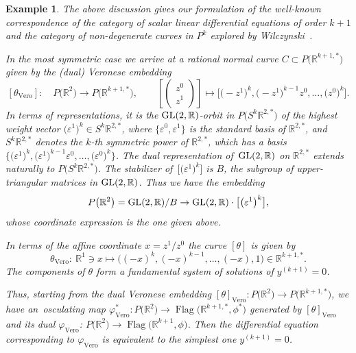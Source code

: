 \documentclass[10pt,a4paper]{amsart}
\newcommand{\R}{\mathbb R}
\newcommand{\Flag}{\operatorname{Flag}}
\newtheorem{ex}[thm]{Example}
\numberwithin{equation}{section}
\begin{document}
\begin{ex}
The above discussion gives our formulation of the well-known correspondence of the category of scalar linear differential equations of order $k+1$ and the category of non-degenerate curves in $P^k$ explored by Wilczynski~\cite{wilch}.

In the most symmetric case we arrive at a rational normal curve $C\subset P\big(\R^{k+1,*}\big)$ given by the (dual) Veronese embedding
\[
[\theta_\text{{Vero}}] \colon\quad P\big(\R^2\big)\to P\big(\R^{k+1,*}\big),\qquad
\left[\begin{pmatrix}z^0\\ z^1\end{pmatrix}\right]\mapsto \big[\big({-}z^1\big)^k, \big({-}z^1\big)^{k-1}z^0, \dots, \big(z^0\big)^k\big].
\]
In terms of representations, it is the ${\rm GL}(2,\R)$-orbit in $P\big(S^k\R^{2,*}\big)$ of the highest weight vector $\big(\varepsilon^1\big)^k\in S^k\R^{2,*}$, where $\big\{\varepsilon^0,\varepsilon^1\big\}$ is the standard basis of $\R^{2,*}$, and $S^k\R^{2,*}$ denotes the $k$-th symmetric power of $\R^{2,*}$, which has a basis $\big\{ \big(\varepsilon^1\big)^k, \big(\varepsilon^1\big)^{k-1}\varepsilon^0, \dots, \big(\varepsilon^0\big)^k \big\}$. The dual representation of~${\rm GL}(2,\R)$ on $\R^{2,*}$ extends naturally to $P\big(S^k\R^{2,*}\big)$. The stabilizer of~$\big[\big(\varepsilon^1\big)^k\big]$ is $B$, the subgroup of upper-triangular matrices in ${\rm GL}(2,\R)$. Thus we have the embedding
\[
P\big(\R^2\big)={\rm GL}(2,\R)/B \to {\rm GL}(2,\R)\cdot \big[\big(\varepsilon^1\big)^k\big],
\]
whose coordinate expression is the one given above.

In terms of the affine coordinate $x=z^1/z^0$ the curve $[\theta]$ is given by
\[
\theta_{\text{Vero}} \colon\ \R^1\ni x\mapsto \big( (-x)^k, (-x)^{k-1},\dots, (-x), 1\big) \in \R^{k+1,*}.
\]
The components of $\theta$ form a fundamental system of solutions of $y^{(k+1)}=0$.

Thus, starting from the dual Veronese embedding $[\theta]_{\text{Vero}}\colon P\big(\R^2\big) \to P\big(\R^{k+1,*}\big)$, we have an~oscu\-lating map $\varphi^*_{\text{Vero}}\colon P\big(\R^2\big)\to \Flag\big(\R^{k+1,*},\phi^*\big)$ generated by $[\theta]_{\text{Vero}}$ and its dual $\varphi_{\text{Vero}}$: $P\big(\R^2\big)\to \Flag\big(\R^{k+1},\phi\big)$. Then the differential equation corresponding to $\varphi_{\text{Vero}}$ is equivalent to the simplest one $y^{(k+1)}=0$.
\end{ex}
\end{document}
